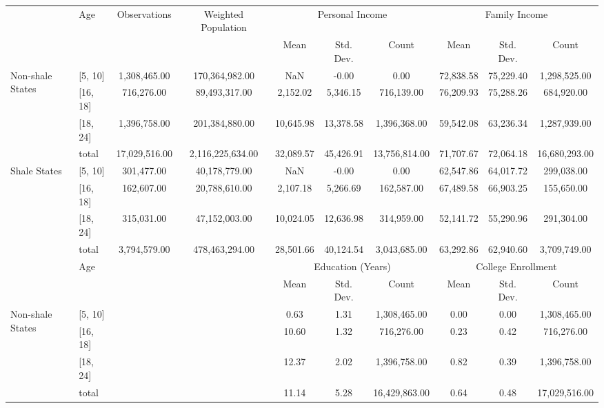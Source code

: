 \begin{table}[ht]
\centering
\begin{tabular}{l|l||c|c|ccc|ccc}
  \hline 
 & Age  & Observations & Weighted Population & \multicolumn{3}{c|}{Personal Income} & \multicolumn{3}{c}{Family Income} \\ 
 &  & & & Mean & Std. Dev. & Count & Mean & Std. Dev. & Count\\ 
  \hline 
   \multirow{4}{*}{Non-shale States} & [5, 10] & 1,308,465.00 & 170,364,982.00 & NaN & -0.00 & 0.00 & 72,838.58 & 75,229.40 & 1,298,525.00 \\ 
   & [16, 18] & 716,276.00 & 89,493,317.00 & 2,152.02 & 5,346.15 & 716,139.00 & 76,209.93 & 75,288.26 & 684,920.00 \\ 
   & [18, 24] & 1,396,758.00 & 201,384,880.00 & 10,645.98 & 13,378.58 & 1,396,368.00 & 59,542.08 & 63,236.34 & 1,287,939.00 \\ 
   & total & 17,029,516.00 & 2,116,225,634.00 & 32,089.57 & 45,426.91 & 13,756,814.00 & 71,707.67 & 72,064.18 & 16,680,293.00 \\ 
   \multirow{4}{*}{Shale States} & [5, 10] & 301,477.00 & 40,178,779.00 & NaN & -0.00 & 0.00 & 62,547.86 & 64,017.72 & 299,038.00 \\ 
   & [16, 18] & 162,607.00 & 20,788,610.00 & 2,107.18 & 5,266.69 & 162,587.00 & 67,489.58 & 66,903.25 & 155,650.00 \\ 
   & [18, 24] & 315,031.00 & 47,152,003.00 & 10,024.05 & 12,636.98 & 314,959.00 & 52,141.72 & 55,290.96 & 291,304.00 \\ 
   & total & 3,794,579.00 & 478,463,294.00 & 28,501.66 & 40,124.54 & 3,043,685.00 & 63,292.86 & 62,940.60 & 3,709,749.00 \\ 
   \hline \hline
   & Age & \multirow{10}{*}{} & \multirow{10}{*}{}& \multicolumn{3}{c|}{Education (Years)} & \multicolumn{3}{c}{College Enrollment} \\ 
  & &  & & Mean & Std. Dev. & Count  & Mean & Std. Dev. & Count  \\ 
  \hline
   \multirow{4}{*}{Non-shale States} & [5, 10] & &  & 0.63 & 1.31 & 1,308,465.00 & 0.00 & 0.00 & 1,308,465.00 \\ 
   & [16, 18] & &  & 10.60 & 1.32 & 716,276.00 & 0.23 & 0.42 & 716,276.00 \\ 
   & [18, 24] &  &  & 12.37 & 2.02 & 1,396,758.00 & 0.82 & 0.39 & 1,396,758.00 \\ 
   & total &  & & 11.14 & 5.28 & 16,429,863.00 & 0.64 & 0.48 & 17,029,516.00 \\ 

\end{tabular}
\end{table}
